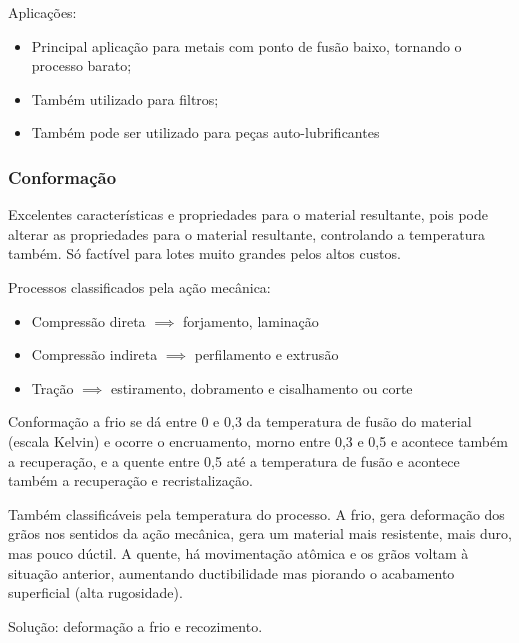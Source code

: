 Aplicações:
\begin{itemize}
    \item Principal aplicação para metais com ponto de fusão baixo, tornando o processo barato;
\item 	Também utilizado para filtros;
   \item  Também pode ser utilizado para peças auto-lubrificantes
\end{itemize}

\subsubsection*{Conformação}

Excelentes características e propriedades para o material resultante, pois pode alterar as propriedades para o material resultante, controlando a temperatura também. Só factível para lotes muito grandes pelos altos custos.

Processos classificados pela ação mecânica:
\begin{itemize}
    \item Compressão direta $\implies$ forjamento, laminação
\item Compressão indireta $\implies$	perfilamento e extrusão
	\item Tração $\implies$ estiramento, dobramento e cisalhamento ou corte
\end{itemize}

Conformação a frio se dá entre 0 e 0,3 da temperatura de fusão do material (escala Kelvin) e ocorre o encruamento, morno entre 0,3 e 0,5 e acontece também a recuperação, e a quente entre 0,5 até a temperatura de fusão e acontece também a recuperação e recristalização.

Também classificáveis pela temperatura do processo. A frio, gera deformação dos grãos nos sentidos da ação mecânica, gera um material mais resistente, mais duro, mas pouco dúctil. A quente, há movimentação atômica e os grãos voltam à situação anterior, aumentando ductibilidade mas piorando o acabamento superficial (alta rugosidade).

Solução: deformação a frio e recozimento.

